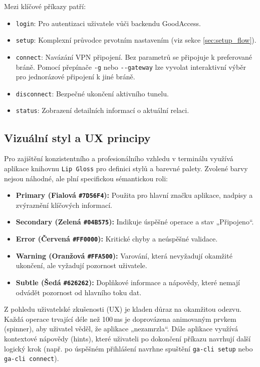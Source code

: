 Mezi klíčové příkazy patří:
\begin{itemize}
    \item \texttt{login}: Pro autentizaci uživatele vůči backendu GoodAccess.
    \item \texttt{setup}: Komplexní průvodce prvotním nastavením (viz sekce \ref{sec:setup_flow}).
    \item \texttt{connect}: Navázání VPN připojení. Bez parametrů se připojuje k preferované bráně. Pomocí přepínače \texttt{-g} nebo \texttt{-{}-gateway} lze vyvolat interaktivní výběr pro jednorázové připojení k jiné bráně.
    \item \texttt{disconnect}: Bezpečné ukončení aktivního tunelu.
    \item \texttt{status}: Zobrazení detailních informací o aktuální relaci.
\end{itemize}

\subsection{Vizuální styl a UX principy}
\label{sec:vizualni_styl}
Pro zajištění konzistentního a profesionálního vzhledu v terminálu využívá aplikace knihovnu \texttt{Lip Gloss} pro definici stylů a barevné palety. Zvolené barvy nejsou náhodné, ale plní specifickou sémantickou roli:

\begin{itemize}
    \item \textcolor[HTML]{7D56F4}{\textbf{Primary (Fialová \texttt{\#7D56F4}):}} Použita pro hlavní značku aplikace, nadpisy a zvýraznění klíčových informací.
    \item \textcolor[HTML]{04B575}{\textbf{Secondary (Zelená \texttt{\#04B575}):}} Indikuje úspěšné operace a stav „Připojeno“.
    \item \textcolor[HTML]{FF0000}{\textbf{Error (Červená \texttt{\#FF0000}):}} Kritické chyby a neúspěšné validace.
    \item \textcolor[HTML]{FFA500}{\textbf{Warning (Oranžová \texttt{\#FFA500}):}} Varování, která nevyžadují okamžité ukončení, ale vyžadují pozornost uživatele.
    \item \textcolor[HTML]{626262}{\textbf{Subtle (Šedá \texttt{\#626262}):}} Doplňkové informace a nápovědy, které nemají odvádět pozornost od hlavního toku dat.
\end{itemize}

Z pohledu uživatelské zkušenosti (UX) je kladen důraz na okamžitou odezvu. Každá operace trvající déle než 100\,ms je doprovázena animovaným prvkem (spinner), aby uživatel věděl, že aplikace „nezamrzla“. Dále aplikace využívá kontextové nápovědy (hints), které uživateli po dokončení příkazu navrhují další logický krok (např. po úspěšném přihlášení navrhne spuštění \texttt{ga-cli setup} nebo \texttt{ga-cli connect}).

